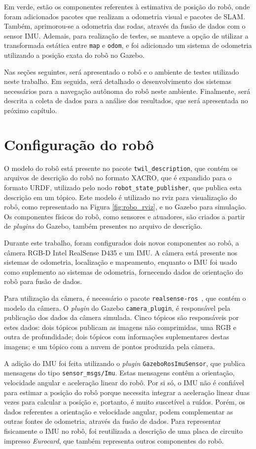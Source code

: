 \documentclass[repeatfields,xlists,xpacks,oneside,yearsonly]{ufrgscca}
\begin{document}
Em verde, estão os componentes referentes à estimativa de posição do
robô, onde foram adicionados pacotes que realizam a odometria visual
e pacotes de SLAM. Também, aprimorou-se a odometria das rodas,
através da fusão de dados com o sensor IMU. Ademais, para realização
de testes, se manteve a opção de utilizar a transformada estática
entre \texttt{map} e \texttt{odom}, e foi adicionado um sistema de
odometria utilizando a posição exata do robô no Gazebo.

Nas seções seguintes, será apresentado o robô e o ambiente de testes
utilizado neste trabalho. Em seguida, será detalhado o
desenvolvimento dos sistemas necessários para a navegação autônoma do
robô neste ambiente. Finalmente, será descrita a coleta de dados para
a análise dos resultados, que será apresentada no próximo capítulo.

\section{Configuração do robô}

O modelo do robô está presente no pacote \texttt{twil\_description},
que contém os arquivos de descrição do robô no formato XACRO, que é
expandido para o formato URDF, utilizado pelo nodo
\texttt{robot\_state\_publisher}, que publica esta descrição em um
tópico. Este modelo é utilizado no rviz para visualização do robô,
como representado na Figura \ref{fig:robo_rviz}, e no Gazebo para
simulação. Os componentes físicos do robô, como sensores e atuadores,
são criados a partir de \textit{plugins} do Gazebo, também presentes
no arquivo de descrição.

Durante este trabalho, foram configurados dois novos componentes ao
robô, a câmera RGB-D Intel RealSense D435 e um IMU. A câmera está
presente nos sistemas de odometria, localização e mapeamento,
enquanto o IMU foi usado como suplemento ao sistemas de odometria,
fornecendo dados de orientação do robô para fusão de dados.

Para utilização da câmera, é necessário o pacote
\texttt{realsense-ros}~\cite{realsense_ros}, que contém o modelo da
câmera. O \textit{plugin} do Gazebo \texttt{camera\_plugin}, é
responsável pela publicação dos dados da câmera simulada. Cinco
tópicos são responsáveis por estes dados: dois tópicos publicam as
imagens não comprimidas, uma RGB e outra de profundidade; dois
tópicos com informações suplementares destas imagens; e um tópico com
a nuvem de pontos produzida pela câmera.

A adição do IMU foi feita utilizando o \textit{plugin}
\texttt{GazeboRosImuSensor}, que publica mensagens do tipo
\texttt{sensor\_msgs/Imu}. Estas mensagens contêm a orientação,
velocidade angular e aceleração linear do robô. Por si só, o IMU não
é confiável para estimar a posição do robô porque necessita integrar
a aceleração linear duas vezes para calcular a posição e, portanto, é
muito suscetível a ruídos. Porém, os dados referentes a orientação e
velocidade angular, podem complementar as outras fontes de odometria,
através da fusão de dados. Para representar fisicamente o IMU no
robô, foi reutilizada a descrição de uma placa de circuito impresso
\textit{Eurocard}, que também representa outros componentes do robô.
\end{document}
